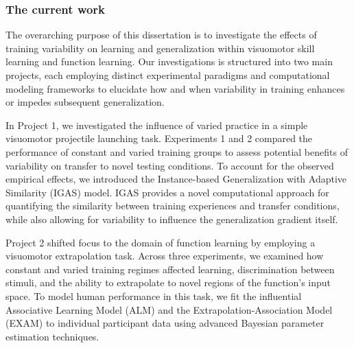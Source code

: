 \documentclass[
  12pt,
  letterpaper,
]{article}
\begin{document}
\subsubsection{The current work}\label{the-current-work}

The overarching purpose of this dissertation is to investigate the
effects of training variability on learning and generalization within
visuomotor skill learning and function learning. Our investigations is
structured into two main projects, each employing distinct experimental
paradigms and computational modeling frameworks to elucidate how and
when variability in training enhances or impedes subsequent
generalization.

In Project 1, we investigated the influence of varied practice in a
simple visuomotor projectile launching task. Experiments 1 and 2
compared the performance of constant and varied training groups to
assess potential benefits of variability on transfer to novel testing
conditions. To account for the observed empirical effects, we introduced
the Instance-based Generalization with Adaptive Similarity (IGAS) model.
IGAS provides a novel computational approach for quantifying the
similarity between training experiences and transfer conditions, while
also allowing for variability to influence the generalization gradient
itself.

Project 2 shifted focus to the domain of function learning by employing
a visuomotor extrapolation task. Across three experiments, we examined
how constant and varied training regimes affected learning,
discrimination between stimuli, and the ability to extrapolate to novel
regions of the function's input space. To model human performance in
this task, we fit the influential Associative Learning Model (ALM) and
the Extrapolation-Association Model (EXAM) to individual participant
data using advanced Bayesian parameter estimation techniques.


\printbibliography[title=References]
\end{document}
